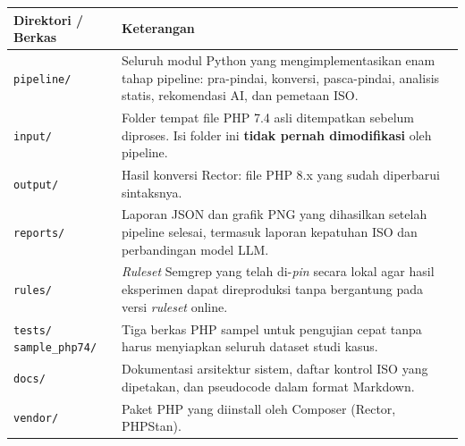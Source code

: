 \begin{center}
\renewcommand{\arraystretch}{1.3}
\begin{tabular}{|p{3.5cm}|p{11cm}|}
\hline
\textbf{Direktori / Berkas} & \textbf{Keterangan} \\
\hline
\texttt{pipeline/} &
  Seluruh modul Python yang mengimplementasikan enam tahap pipeline:
  pra-pindai, konversi, pasca-pindai, analisis statis, rekomendasi AI,
  dan pemetaan ISO. \\
\hline
\texttt{input/} &
  Folder tempat file PHP 7.4 asli ditempatkan sebelum diproses.
  Isi folder ini \textbf{tidak pernah dimodifikasi} oleh pipeline. \\
\hline
\texttt{output/} &
  Hasil konversi Rector: file PHP 8.x yang sudah diperbarui sintaksnya. \\
\hline
\texttt{reports/} &
  Laporan JSON dan grafik PNG yang dihasilkan setelah pipeline selesai,
  termasuk laporan kepatuhan ISO dan perbandingan model LLM. \\
\hline
\texttt{rules/} &
  \textit{Ruleset} Semgrep yang telah di-\textit{pin} secara lokal agar
  hasil eksperimen dapat direproduksi tanpa bergantung pada versi
  \textit{ruleset} online. \\
\hline
\texttt{tests/
        sample\_php74/} &
  Tiga berkas PHP sampel untuk pengujian cepat tanpa harus menyiapkan
  seluruh dataset studi kasus. \\
\hline
\texttt{docs/} &
  Dokumentasi arsitektur sistem, daftar kontrol ISO yang dipetakan,
  dan pseudocode dalam format Markdown. \\
\hline
\texttt{vendor/} &
  Paket PHP yang diinstall oleh Composer (Rector, PHPStan). \\
\hline
\end{tabular}
\end{center}
